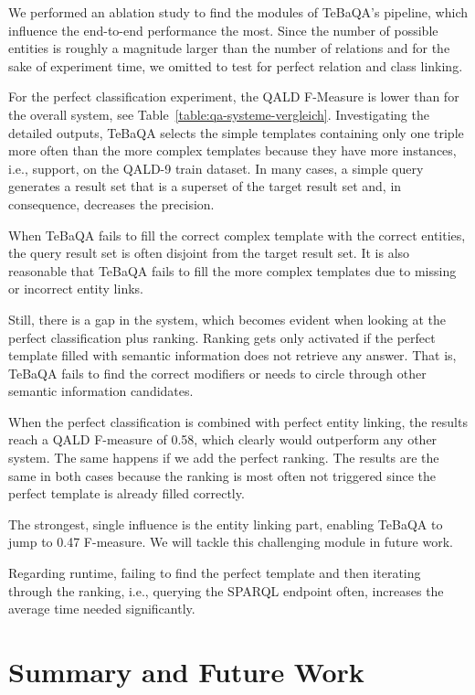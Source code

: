 \documentclass{IOS-Book-Article}
\begin{document}
We performed an ablation study to find the modules of TeBaQA's pipeline, which influence the end-to-end performance the most. Since the number of possible entities is roughly a magnitude larger than the number of relations and for the sake of experiment time, we omitted to test for perfect relation and class linking. 

For the perfect classification experiment, the QALD F-Measure is lower than for the overall system, see Table~\ref{table:qa-systeme-vergleich}.
Investigating the detailed outputs, TeBaQA selects the simple templates containing only one triple more often than the more complex templates because they have more instances, i.e., support, on the QALD-9 train dataset. In many cases, a simple query generates a result set that is a superset of the target result set and, in consequence, decreases the precision. 

When TeBaQA fails to fill the correct complex template with the correct entities, the query result set is often disjoint from the target result set. 
It is also reasonable that TeBaQA fails to fill the more complex templates due to missing or incorrect entity links.

Still, there is a gap in the system, which becomes evident when looking at the perfect classification plus ranking. Ranking gets only activated if the perfect template filled with semantic information does not retrieve any answer. That is, TeBaQA fails to find the correct modifiers or needs to circle through other semantic information candidates.

When the perfect classification is combined with perfect entity linking, the results reach a QALD F-measure of 0.58, which clearly would outperform any other system. The same happens if we add the perfect ranking. The results are the same in both cases because the ranking is most often not triggered since the perfect template is already filled correctly. 

The strongest, single influence is the entity linking part, enabling TeBaQA to jump to 0.47 F-measure. We will tackle this challenging module in future work.

Regarding runtime, failing to find the perfect template and then iterating through the ranking, i.e., querying the SPARQL endpoint often, increases the average time needed significantly.

\section{Summary and Future Work}
\end{document}
